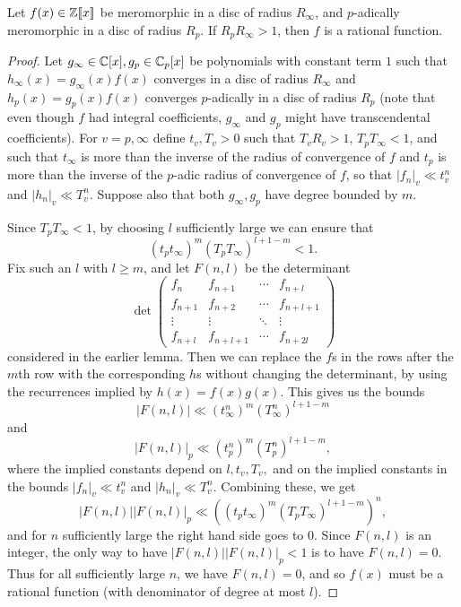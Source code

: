 \documentclass[letterpaper,11pt]{article}
\begin{document}
\begin{thm} Let $f(x) \in \mathbb{Z}[\![x]\!]$ be meromorphic in a disc of radius $R_{\infty}$, and $p$-adically meromorphic in a disc of radius $R_p$. If $R_pR_{\infty} > 1$, then $f$ is a rational function.
\end{thm}
\begin{proof} Let $g_{\infty} \in \mathbb{C}[x], g_p \in \mathbb{C}_p[x]$ be polynomials with constant term $1$ such that $h_{\infty}(x) = g_\infty(x)f(x)$ converges in a disc of radius $R_{\infty}$ and $h_p(x) = g_p(x)f(x)$ converges $p$-adically in a disc of radius $R_p$ (note that even though $f$ had integral coefficients, $g_{\infty}$ and $g_p$ might have transcendental coefficients). For $v = p, \infty$ define $t_v, T_v > 0$ such that $T_vR_v > 1$, $T_pT_\infty < 1$, and such that $t_{\infty}$ is more than the inverse of the radius of convergence of $f$ and $t_p$ is more than the inverse of the $p$-adic radius of convergence of $f$, so that $|f_n|_v \ll t_v^n$ and $|h_n|_v \ll T_v^n$. Suppose also that both $g_\infty, g_p$ have degree bounded by $m$.

Since $T_pT_{\infty} < 1$, by choosing $l$ sufficiently large we can ensure that
\[
(t_pt_{\infty})^m (T_pT_{\infty})^{l+1-m} < 1.
\]
Fix such an $l$ with $l \ge m$, and let $F(n,l)$ be the determinant
\[
\det\begin{pmatrix}f_n & f_{n+1} & \cdots & f_{n+l} \\ f_{n+1} & f_{n+2} & \cdots & f_{n+l+1}\\ \vdots & \vdots & \ddots & \vdots \\ f_{n+l} & f_{n+l+1} & \cdots & f_{n+2l}\end{pmatrix}
\]
considered in the earlier lemma. Then we can replace the $f$s in the rows after the $m$th row with the corresponding $h$s without changing the determinant, by using the recurrences implied by $h(x) = f(x)g(x)$. This gives us the bounds
\[
|F(n,l)| \ll (t_{\infty}^n)^m (T_{\infty}^n)^{l+1-m}
\]
and
\[
|F(n,l)|_p \ll (t_p^n)^m (T_p^n)^{l+1-m},
\]
where the implied constants depend on $l, t_v, T_v,$ and on the implied constants in the bounds $|f_n|_v \ll t_v^n$ and $|h_n|_v \ll T_v^n$.
Combining these, we get
\[
|F(n,l)||F(n,l)|_p \ll ((t_pt_{\infty})^m (T_pT_{\infty})^{l+1-m})^n,
\]
and for $n$ sufficiently large the right hand side goes to $0$. Since $F(n,l)$ is an integer, the only way to have $|F(n,l)||F(n,l)|_p < 1$ is to have $F(n,l) = 0$. Thus for all sufficiently large $n$, we have $F(n,l) = 0$, and so $f(x)$ must be a rational function (with denominator of degree at most $l$).
\end{proof}
\end{document}
